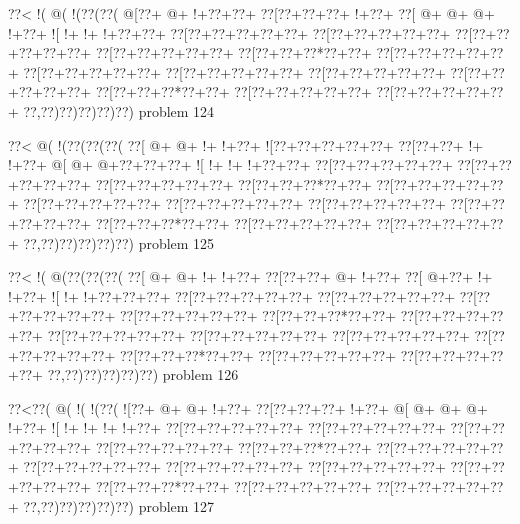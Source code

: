 \vbox{\vbox{\goo
\0??<\- !(\- @(\- !(\0??(\0??(
\- @[\0??+\- @+\- !+\0??+\0??+
\0??[\0??+\0??+\0??+\- !+\0??+
\0??[\- @+\- @+\- @+\- !+\0??+
\- ![\- !+\- !+\- !+\0??+\0??+
\0??[\0??+\0??+\0??+\0??+\0??+
\0??[\0??+\0??+\0??+\0??+\0??+
\0??[\0??+\0??+\0??+\0??+\0??+
\0??[\0??+\0??+\0??+\0??+\0??+
\0??[\0??+\0??+\0??*\0??+\0??+
\0??[\0??+\0??+\0??+\0??+\0??+
\0??[\0??+\0??+\0??+\0??+\0??+
\0??[\0??+\0??+\0??+\0??+\0??+
\0??[\0??+\0??+\0??+\0??+\0??+
\0??[\0??+\0??+\0??+\0??+\0??+
\0??[\0??+\0??+\0??*\0??+\0??+
\0??[\0??+\0??+\0??+\0??+\0??+
\0??[\0??+\0??+\0??+\0??+\0??+
\0??,\0??)\0??)\0??)\0??)\0??)
}
\hfil problem 124\hfil\break
}

\vbox{\vbox{\goo
\0??<\- @(\- !(\0??(\0??(\0??(
\0??[\- @+\- @+\- !+\- !+\0??+
\- ![\0??+\0??+\0??+\0??+\0??+
\0??[\0??+\0??+\- !+\- !+\0??+
\- @[\- @+\- @+\0??+\0??+\0??+
\- ![\- !+\- !+\- !+\0??+\0??+
\0??[\0??+\0??+\0??+\0??+\0??+
\0??[\0??+\0??+\0??+\0??+\0??+
\0??[\0??+\0??+\0??+\0??+\0??+
\0??[\0??+\0??+\0??*\0??+\0??+
\0??[\0??+\0??+\0??+\0??+\0??+
\0??[\0??+\0??+\0??+\0??+\0??+
\0??[\0??+\0??+\0??+\0??+\0??+
\0??[\0??+\0??+\0??+\0??+\0??+
\0??[\0??+\0??+\0??+\0??+\0??+
\0??[\0??+\0??+\0??*\0??+\0??+
\0??[\0??+\0??+\0??+\0??+\0??+
\0??[\0??+\0??+\0??+\0??+\0??+
\0??,\0??)\0??)\0??)\0??)\0??)
}
\hfil problem 125\hfil\break
}

\vbox{\vbox{\goo
\0??<\- !(\- @(\0??(\0??(\0??(
\0??[\- @+\- @+\- !+\- !+\0??+
\0??[\0??+\0??+\- @+\- !+\0??+
\0??[\- @+\0??+\- !+\- !+\0??+
\- ![\- !+\- !+\0??+\0??+\0??+
\0??[\0??+\0??+\0??+\0??+\0??+
\0??[\0??+\0??+\0??+\0??+\0??+
\0??[\0??+\0??+\0??+\0??+\0??+
\0??[\0??+\0??+\0??+\0??+\0??+
\0??[\0??+\0??+\0??*\0??+\0??+
\0??[\0??+\0??+\0??+\0??+\0??+
\0??[\0??+\0??+\0??+\0??+\0??+
\0??[\0??+\0??+\0??+\0??+\0??+
\0??[\0??+\0??+\0??+\0??+\0??+
\0??[\0??+\0??+\0??+\0??+\0??+
\0??[\0??+\0??+\0??*\0??+\0??+
\0??[\0??+\0??+\0??+\0??+\0??+
\0??[\0??+\0??+\0??+\0??+\0??+
\0??,\0??)\0??)\0??)\0??)\0??)
}
\hfil problem 126\hfil\break
}

\vbox{\vbox{\goo
\0??<\0??(\- @(\- !(\- !(\0??(
\- ![\0??+\- @+\- @+\- !+\0??+
\0??[\0??+\0??+\0??+\- !+\0??+
\- @[\- @+\- @+\- @+\- !+\0??+
\- ![\- !+\- !+\- !+\- !+\0??+
\0??[\0??+\0??+\0??+\0??+\0??+
\0??[\0??+\0??+\0??+\0??+\0??+
\0??[\0??+\0??+\0??+\0??+\0??+
\0??[\0??+\0??+\0??+\0??+\0??+
\0??[\0??+\0??+\0??*\0??+\0??+
\0??[\0??+\0??+\0??+\0??+\0??+
\0??[\0??+\0??+\0??+\0??+\0??+
\0??[\0??+\0??+\0??+\0??+\0??+
\0??[\0??+\0??+\0??+\0??+\0??+
\0??[\0??+\0??+\0??+\0??+\0??+
\0??[\0??+\0??+\0??*\0??+\0??+
\0??[\0??+\0??+\0??+\0??+\0??+
\0??[\0??+\0??+\0??+\0??+\0??+
\0??,\0??)\0??)\0??)\0??)\0??)
}
\hfil problem 127\hfil\break
}

